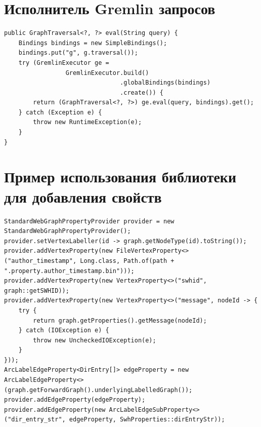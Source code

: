 \documentclass[times,specification,annotation]{itmo-student-thesis}
\begin{document}
\printmainbibliography

\appendix

\chapter{Исполнитель Gremlin запросов}\label{sec:app:eval}
\begin{lstlisting}[float=!h,caption={Реализация исполнителя Gremlin запросов},label={lst:gremlin-eval}]
public GraphTraversal<?, ?> eval(String query) {
    Bindings bindings = new SimpleBindings();
    bindings.put("g", g.traversal());
    try (GremlinExecutor ge =
                 GremlinExecutor.build()
                                .globalBindings(bindings)
                                .create()) {
        return (GraphTraversal<?, ?>) ge.eval(query, bindings).get();
    } catch (Exception e) {
        throw new RuntimeException(e);
    }
}
\end{lstlisting}

\chapter{Пример использования библиотеки для добавления свойств}\label{sec:app:swh-props}
\begin{lstlisting}[float=!h,caption={Добавление свойств для графа Software Heritage},label={lst:props}]
StandardWebGraphPropertyProvider provider = new StandardWebGraphPropertyProvider();
provider.setVertexLabeller(id -> graph.getNodeType(id).toString());
provider.addVertexProperty(new FileVertexProperty<>("author_timestamp", Long.class, Path.of(path + ".property.author_timestamp.bin")));
provider.addVertexProperty(new VertexProperty<>("swhid", graph::getSWHID));
provider.addVertexProperty(new VertexProperty<>("message", nodeId -> {
    try {
        return graph.getProperties().getMessage(nodeId);
    } catch (IOException e) {
        throw new UncheckedIOException(e);
    }
}));
ArcLabelEdgeProperty<DirEntry[]> edgeProperty = new ArcLabelEdgeProperty<>(graph.getForwardGraph().underlyingLabelledGraph());
provider.addEdgeProperty(edgeProperty);
provider.addEdgeProperty(new ArcLabelEdgeSubProperty<>("dir_entry_str", edgeProperty, SwhProperties::dirEntryStr));
\end{lstlisting}
\end{document}
